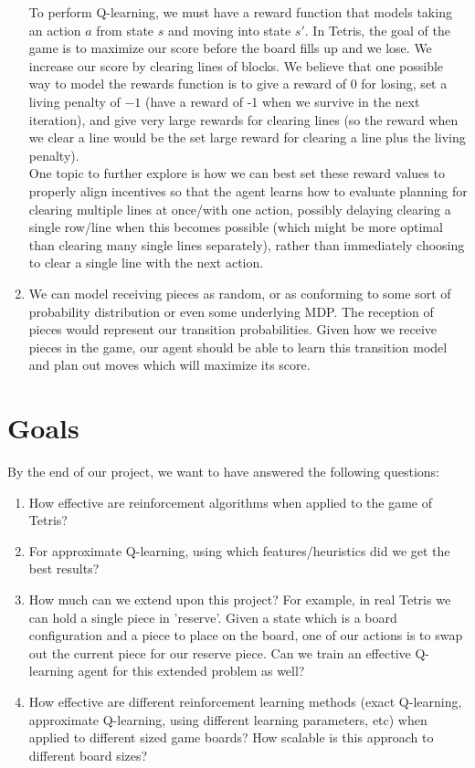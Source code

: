 \documentclass{article}
\begin{document}
\begin{enumerate}
    To perform Q-learning, we must have a reward function that models taking an action $a$ from state $s$ and moving into state $s'$. In Tetris, the goal of the game is to maximize our score before the board fills up and we lose. We increase our score by clearing lines of blocks. We believe that one possible way to model the rewards function is to give a reward of 0 for losing, set a living penalty of $-1$ (have a reward of -1 when we survive in the next iteration), and give very large rewards for clearing lines (so the reward when we clear a line would be the set large reward for clearing a line plus the living penalty). \\ One topic to further explore is how we can best set these reward values to properly align incentives so that the agent learns how to evaluate planning for clearing multiple lines at once/with one action, possibly delaying clearing a single row/line when this becomes possible (which might be more optimal than clearing many single lines separately), rather than immediately choosing to clear a single line with the next action.
    \item We can model receiving pieces as random, or as conforming to some sort of probability distribution or even some underlying MDP. The reception of pieces would represent our transition probabilities. Given how we receive pieces in the game, our agent should be able to learn this transition model and plan out moves which will maximize its score.
\end{enumerate}

\section{Goals}
By the end of our project, we want to have answered the following questions:
\begin{enumerate}
    \item How effective are reinforcement algorithms when applied to the game of Tetris?
    \item For approximate Q-learning, using which features/heuristics did we get the best results?
    \item How much can we extend upon this project? For example, in real Tetris we can hold a single piece in 'reserve'. Given a state which is a board configuration and a piece to place on the board, one of our actions is to swap out the current piece for our reserve piece. Can we train an effective Q-learning agent for this extended problem as well?
    \item How effective are different reinforcement learning methods (exact Q-learning, approximate Q-learning, using different learning parameters, etc) when applied to different sized game boards? How scalable is this approach to different board sizes?
\end{enumerate}
\end{document}

